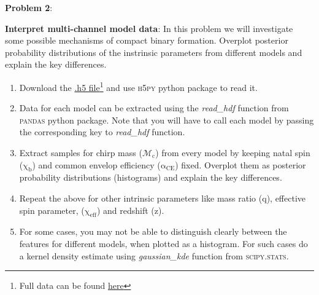 \documentclass{article} %
\newcommand{\question}[2][]{\begin{flushleft}
        \textbf{Problem #1}: %
\end{flushleft}
}
\begin{document}
    \newpage
    
    \question[2]{} \textbf{Interpret multi-channel model data}: In this problem we will investigate some possible mechanisms of compact binary formation. Overplot posterior probability distributions of the instrinsic parameters from different models and explain the key differences.
    
    
    \begin{enumerate}
                \item Download the \href{https://drive.google.com/file/d/15zRrlW-Yby1k_wMhR8DXoVGxkWl-y5fZ/view?usp=sharing}{.h5 file}\footnote{Full data can be found \href{https://zenodo.org/record/4448170#.YmFY03_MKV4}{here}} and use {\textsc{h5py}} python package to read it. 
                \item Data for each model can be extracted using the \textit{read\_hdf} function from {\textsc{pandas}} python package. Note that you will have to call each model by passing the corresponding key to \textit{read\_hdf} function.
                \item Extract samples for chirp mass ($\mathrm{\mathcal{M}_c}$) from every model by keeping  natal spin ($\mathrm{\chi_b}$) and common envelop efficiency ($\mathrm{\alpha_{CE}}$) fixed. Overplot them as posterior probability distributions (histograms) and explain the key differences. 
                \item Repeat the above for other intrinsic parameters like mass ratio ($\mathrm{q}$), effective spin parameter, ($\mathrm{\chi_{eff}}$) and redshift ($\mathrm{z}$).
                \item For some cases, you may not be able to distinguish clearly between the features for different models, when plotted as a histogram. For such cases do a kernel density estimate  using \textit{gaussian\_kde} function from {\textsc{scipy.stats}}.
            \end{enumerate}
    
    
    
        
        
 

 
\end{document}
